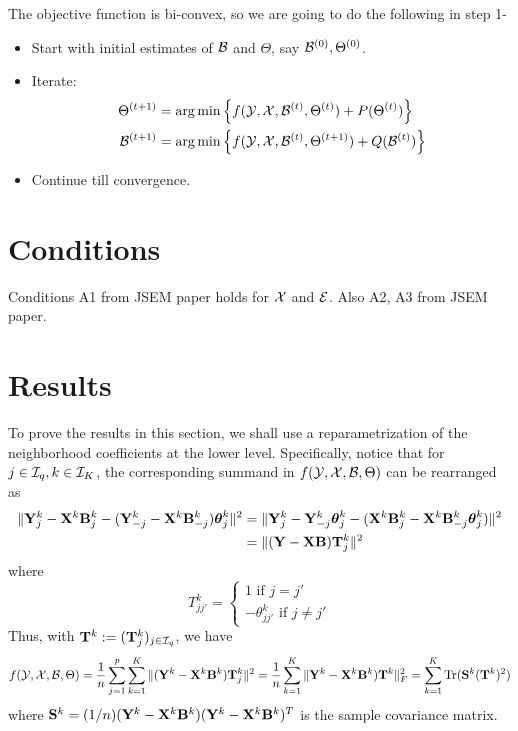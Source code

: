 \documentclass[12pt, letterpaper]{article}
\DeclareMathOperator*{\Tr}{Tr}
\DeclareMathOperator*{\argmin}{arg\,min}
\numberwithin{equation}{section}
\begin{document}
The objective function is bi-convex, so we are going to do the following in step 1-

\begin{itemize}
\item Start with initial estimates of ${\cal{B}}$ and $\Theta$, say ${\cal{B}}^{(0)}, \Theta^{(0)}$.
\item Iterate:
%
\begin{align}
\Theta^{(t+1)} &= \argmin \left\{ f ( \cY, \cX, \cB^{(t)}, \Theta^{(t)}) + P (\Theta^{(t)}) \right\}\\
\cB^{(t+1)} &= \argmin \left\{ f ( \cY, \cX, \cB^{(t)}, \Theta^{(t+1)}) + Q (\cB^{(t)}) \right\}
\end{align}
\item Continue till convergence.
\end{itemize}
%

\section{Conditions}
Conditions A1 from JSEM paper holds for ${\cal{X}}$ and ${\cal{E}}$. Also A2, A3 from JSEM paper.

\section{Results}
To prove the results in this section, we shall use a reparametrization of the neighborhood coefficients at the lower level. Specifically, notice that for $j \in {\cal{I}}_q, k \in {\cal{I}}_K$, the corresponding summand in $f({\cal{Y}}, {\cal{X}}, {\cal{B}}, \Theta)$ can be rearranged as
%
\begin{align*}
\| {\mathbf{Y}}^k_j - {\mathbf{X}}^k {\mathbf{B}}_j^k - ({\mathbf{Y}}_{-j}^k - {\mathbf{X}}^k {\mathbf{B}}_{-j}^k) {\boldsymbol{\theta}}_j^k \|^2 &=
\| {\mathbf{Y}}^k_j - {\mathbf{Y}}_{-j}^k {\boldsymbol{\theta}}_j^k - ({\mathbf{X}}^k {\mathbf{B}}_j^k -{\mathbf{X}}^k {\mathbf{B}}_{-j}^k {\boldsymbol{\theta}}_j^k) \|^2 \\
&= \| ( {\mathbf{Y}} - {\mathbf{X}} {\mathbf{B}} ) {\mathbf{T}}_j^k \|^2
\end{align*}
%
where
%
$$
T_{jj'}^k = \begin{cases}
1 \text{ if } j = j'\\
- \theta_{jj'}^k \text{ if } j \neq j'
\end{cases}
$$
%
Thus, with ${\mathbf{T}}^k := ({\mathbf{T}}_j^k)_{j \in {\cal{I}}_q}$, we have
$$
f( \cY, \cX, \cB, \Theta) = \frac{1}{n} \sum_{j=1}^p \sum_{k=1}^K \| ( \bfY^k - \bfX^k \bfB^k ) \bfT_j^k \|^2
= \frac{1}{n} \sum_{k=1}^K \| \bfY^k - \bfX^k \bfB^k ) \bfT^k \|_F^2
= \sum_{k=1}^K \Tr (\bfS^k (\bfT^k)^2 )
$$
%
where ${\mathbf{S}}^k = (1/n) ({\mathbf{Y}}^k - {\mathbf{X}}^k {\mathbf{B}}^k) ({\mathbf{Y}}^k - {\mathbf{X}}^k {\mathbf{B}}^k)^T$ is the sample covariance matrix.
\end{document}
